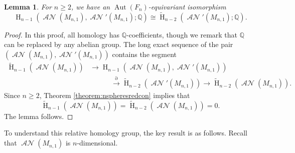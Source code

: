 \documentclass[11pt]{amsart}
\numberwithin{equation}{section}
\theoremstyle{plain}
\newtheorem{lemma}[theorem]{Lemma}
\theoremstyle{definition}
\theoremstyle{remark}
\newcommand\Q{\ensuremath{\mathbb{Q}}}
\DeclareMathOperator{\HH}{H}
\newcommand\RH{\ensuremath{\widetilde{\HH}}}
\DeclareMathOperator{\Aut}{Aut}
\DeclareMathOperator{\ANSpheres}{\mathcal{AN}}
\begin{document}
\begin{lemma}
\label{lemma:identifyrel}
For $n \geq 2$, we have an $\Aut(F_n)$-equivariant isomorphism
\[\HH_{n-1}(\ANSpheres(M_{n,1}),\ANSpheres'(M_{n,1});\Q) \cong \RH_{n-2}(\ANSpheres'(M_{n,1});\Q).\]
\end{lemma}
\begin{proof}
In this proof, all homology has $\Q$-coefficients, though we remark that $\Q$ can be replaced
by any abelian group.  The long exact sequence of the pair $(\ANSpheres(M_{n,1}),\ANSpheres'(M_{n,1}))$ contains the segment
\begin{align*}
\RH_{n-1}(\ANSpheres(M_{n,1})) &\rightarrow \HH_{n-1}(\ANSpheres(M_{n,1}),\ANSpheres'(M_{n,1}))\\
&\quad\quad\quad \stackrel{\partial}{\rightarrow} \RH_{n-2}(\ANSpheres'(M_{n,1}))
\rightarrow \RH_{n-2}(\ANSpheres(M_{n,1})).
\end{align*}
Since $n \geq 2$, Theorem \ref{theorem:nspheresredcon} implies that
\[\RH_{n-1}(\ANSpheres(M_{n,1})) = \RH_{n-2}(\ANSpheres(M_{n,1})) = 0.\]
The lemma follows.
\end{proof}

To understand this relative homology group, the key result is as follows.
Recall that $\ANSpheres(M_{n,1})$ is $n$-dimensional.
\end{document}
